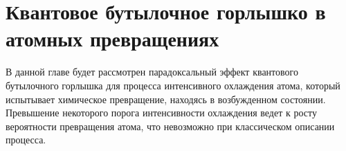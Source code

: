 \chapter{Квантовое бутылочное горлышко в атомных превращениях}\label{ch:ch2}

В данной главе будет рассмотрен парадоксальный эффект квантового бутылочного горлышка для процесса интенсивного охлаждения атома, который испытывает химическое превращение, находясь в возбужденном состоянии. Превышение некоторого порога интенсивности охлаждения ведет к росту вероятности превращения атома, что невозможно при классическом описании процесса.

